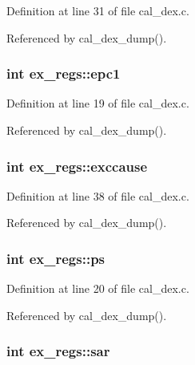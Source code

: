 Definition at line 31 of file cal\-\_\-dex.\-c.



Referenced by cal\-\_\-dex\-\_\-dump().

\hypertarget{structex__regs_a907bf7dfc14dd0b4f3c1e35416551590}{
\subsubsection[{epc1}]{\setlength{\rightskip}{0pt plus 5cm}int ex\-\_\-regs\-::epc1}}\label{structex__regs_a907bf7dfc14dd0b4f3c1e35416551590}


Definition at line 19 of file cal\-\_\-dex.\-c.



Referenced by cal\-\_\-dex\-\_\-dump().

\hypertarget{structex__regs_a001bdc446169cb523be54cf5deeb8dd6}{
\subsubsection[{exccause}]{\setlength{\rightskip}{0pt plus 5cm}int ex\-\_\-regs\-::exccause}}\label{structex__regs_a001bdc446169cb523be54cf5deeb8dd6}


Definition at line 38 of file cal\-\_\-dex.\-c.



Referenced by cal\-\_\-dex\-\_\-dump().

\hypertarget{structex__regs_a41791a7ade763f5f965ca2d412914dbb}{
\subsubsection[{ps}]{\setlength{\rightskip}{0pt plus 5cm}int ex\-\_\-regs\-::ps}}\label{structex__regs_a41791a7ade763f5f965ca2d412914dbb}


Definition at line 20 of file cal\-\_\-dex.\-c.



Referenced by cal\-\_\-dex\-\_\-dump().

\hypertarget{structex__regs_a8fd11e49ee65ba875a04ab28789cf702}{
\subsubsection[{sar}]{\setlength{\rightskip}{0pt plus 5cm}int ex\-\_\-regs\-::sar}}\label{structex__regs_a8fd11e49ee65ba875a04ab28789cf702}


